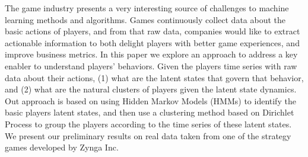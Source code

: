 The game industry presents a very interesting source of challenges to machine learning methods and algorithms.  Games continuously collect data about the basic actions of players, and from that raw data, companies would like to extract actionable information to both delight players with better game experiences, and improve business metrics. In this paper we explore an approach to address a key enabler to understand players' behaviors. Given the players time series with raw data about  their  actions, (1) what are the latent states that govern that behavior, and (2) what are the natural clusters of players given the latent state dynamics.   Out approach is based on using Hidden Markov Models (HMMs) to identify the basic players latent states, and then use a clustering method based on Dirichlet Process to group the players according to the time series of these latent states. We present our preliminary results on real data taken from  one of the strategy games developed by Zynga Inc.\  



